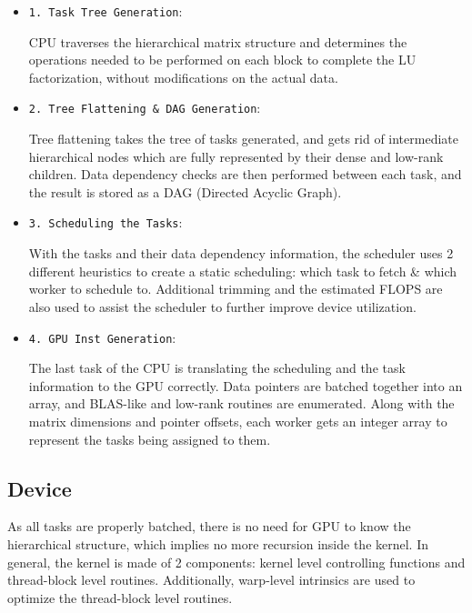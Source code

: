 \documentclass[sigconf]{acmart}
\begin{document}
\begin{itemize}

    \item {\verb|1. Task Tree Generation|}:
    
    CPU traverses the hierarchical matrix structure and determines the operations needed to be performed on each block to complete the LU factorization, without modifications on the actual data.
    
    \item {\verb|2. Tree Flattening & DAG Generation|}:
    
    Tree flattening takes the tree of tasks generated, and gets rid of intermediate hierarchical nodes which are fully represented by their dense and low-rank children. Data dependency checks are then performed between each task, and the result is stored as a DAG (Directed Acyclic Graph).
    
    \item {\verb|3. Scheduling the Tasks|}:
    
    With the tasks and their data dependency information, the scheduler uses 2 different heuristics to create a static scheduling: which task to fetch \& which worker to schedule to. Additional trimming and the estimated FLOPS are also used to assist the scheduler to further improve device utilization.
    
    \item {\verb|4. GPU Inst Generation|}:
    
    The last task of the CPU is translating the scheduling and the task information to the GPU correctly. Data pointers are batched together into an array, and BLAS-like and low-rank routines are enumerated. Along with the matrix dimensions and pointer offsets, each worker gets an integer array to represent the tasks being assigned to them.
    
\end{itemize}


\subsection{Device}

As all tasks are properly batched, there is no need for GPU to know the hierarchical structure, which implies no more recursion inside the kernel. In general, the kernel is made of 2 components: kernel level controlling functions and thread-block level routines. Additionally, warp-level intrinsics are used to optimize the thread-block level routines.
\end{document}
